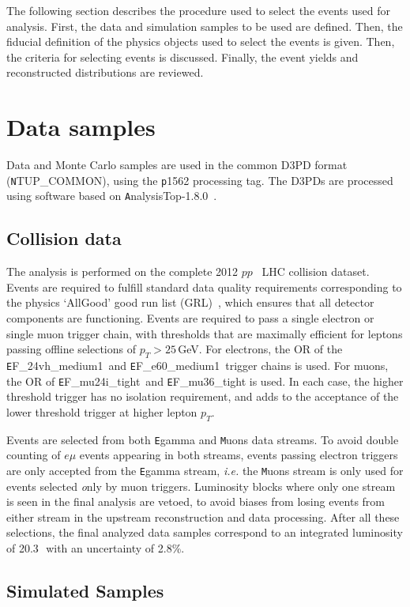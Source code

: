 The following section describes the procedure used to select the events used for analysis. First, the data and simulation samples to be used are defined. Then, the fiducial definition of the physics objects used to select the events is given. Then, the criteria for selecting events is discussed. Finally, the event yields and reconstructed distributions are reviewed.

\section{Data samples}
Data and Monte Carlo samples are used in the common D3PD format ({\texttt NTUP\_COMMON}), using the {\texttt p1562} processing tag. The D3PDs are processed using software based on {\texttt AnalysisTop-1.8.0}~\cite{trc}.

\subsection{Collision data}
The analysis is performed on the complete 2012 $pp$   \tev\ LHC collision dataset. Events are required to
fulfill standard data quality requirements corresponding to the physics  `AllGood' good run list (GRL)~\cite{grl}, which ensures that all detector components are functioning. Events are required to pass a single electron or single muon trigger chain, with thresholds that are maximally efficient for leptons passing offline selections of $p_T>25$\,GeV.  For electrons, the OR of the {\texttt EF\_24vh\_medium1}\ and {\texttt EF\_e60\_medium1}\ trigger chains is used. For muons, the OR of {\texttt EF\_mu24i\_tight}\ and {\texttt EF\_mu36\_tight} is used. In each case, the higher threshold trigger has no isolation requirement, and adds to the acceptance of the lower threshold trigger at higher lepton $p_T$. 

Events are selected from both {\texttt Egamma} and {\texttt Muons} data streams. To avoid double counting of $e\mu$ events appearing in both streams, events passing electron triggers are only accepted from the {\texttt Egamma} stream, {\em i.e.} the {\texttt Muons} stream is only used for events selected {\emph only} by muon triggers. Luminosity blocks where only one stream is seen in the final analysis are vetoed, to avoid biases from losing events from either stream in the upstream reconstruction and data processing. 
After all these selections, the final analyzed data samples correspond to an integrated luminosity of 20.3\,\ifb\ with an uncertainty of 2.8\%.
\subsection{Simulated Samples}

